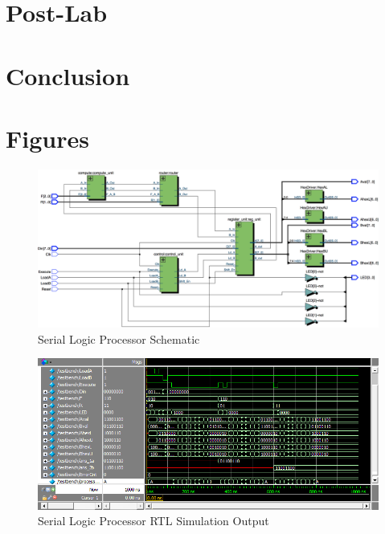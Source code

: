 \documentclass[journal, twocolumn, final,11pt,letterpaper]{IEEEtran}
\begin{document}
\section{Post-Lab}

\section{Conclusion}

\clearpage
\onecolumn
\section{Figures}

\begin{figure} [htbp]
	\centering
	\includegraphics[scale=0.4]{Schematic-Processor.png}
	\caption{Serial Logic Processor Schematic\label{fig:schematic-processor}}
\end{figure}

\begin{figure} [htbp]
	\centering
	\includegraphics[scale=0.6]{processor-output-rtl-simulator.png}
	\caption{Serial Logic Processor RTL Simulation Output\label{fig:processor-output-rtl-simulator}}
\end{figure}


\end{document}
